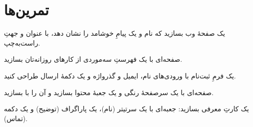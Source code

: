 \section{تمرین‌ها}

\exercise یک صفحهٔ وب بسازید که نام و یک پیامِ خوشامد را نشان دهد، با عنوان و
جهتِ راست‌به‌چپ.

\exercise صفحه‌ای با یک فهرستِ سه‌موردی از کارهای روزانه‌تان بسازید.

\exercise یک فرمِ ثبت‌نام با ورودی‌های نام، ایمیل و گذرواژه و یک دکمهٔ ارسال
طراحی کنید.

\exercise صفحه‌ای با یک سرصفحهٔ رنگی و یک جعبهٔ محتوا بسازید و آن را با
 بسازید.

\exercise یک کارتِ معرفی بسازید: جعبه‌ای با یک سرتیتر (نام)، یک پاراگراف (توضیح) و
یک دکمه (تماس).
